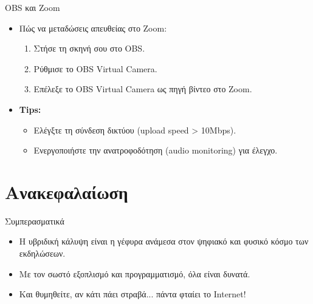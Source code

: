 \documentclass[aspectratio=169]{beamer}
\begin{document}
\begin{frame}{OBS και Zoom}
  \begin{itemize}
  \item Πώς να μεταδώσεις απευθείας στο Zoom:
    \begin{enumerate}[<+->]
    \item Στήσε τη σκηνή σου στο OBS.
    \item Ρύθμισε το OBS Virtual Camera.
    \item Επέλεξε το OBS Virtual Camera ως πηγή βίντεο στο Zoom.
    \end{enumerate}
  \item \textbf{Tips:}
    \begin{itemize}
    \item Ελέγξτε τη σύνδεση δικτύου (upload speed > 10Mbps).
    \item Ενεργοποιήστε την ανατροφοδότηση (audio monitoring) για έλεγχο.
    \end{itemize}
  \end{itemize}
\end{frame}

\section{Ανακεφαλαίωση}
\begin{frame}{Συμπερασματικά}
  \begin{itemize}[<+->]
  \item Η υβριδική κάλυψη είναι η γέφυρα ανάμεσα στον ψηφιακό και φυσικό κόσμο των εκδηλώσεων.
  \item Με τον σωστό εξοπλισμό και προγραμματισμό, όλα είναι δυνατά.
  \item Και θυμηθείτε, αν κάτι πάει στραβά... πάντα φταίει το Internet!
  \end{itemize}
\end{frame}
\end{document}
